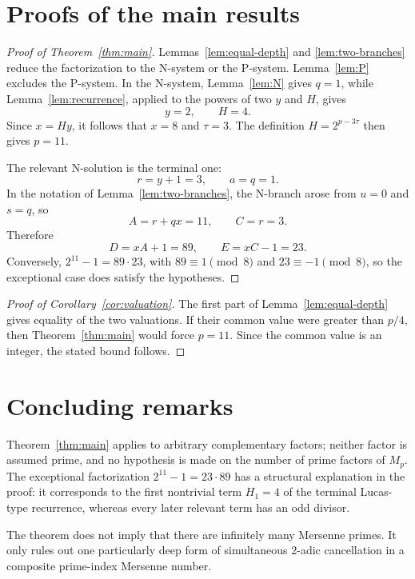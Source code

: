 \documentclass[11pt]{amsart}
\theoremstyle{remark}
\begin{document}
\section{Proofs of the main results}

\begin{proof}[Proof of Theorem~\ref{thm:main}]
Lemmas~\ref{lem:equal-depth} and \ref{lem:two-branches} reduce the
factorization to the N-system or the P-system.  Lemma~\ref{lem:P}
excludes the P-system.  In the N-system, Lemma~\ref{lem:N} gives
$q=1$, while Lemma~\ref{lem:recurrence}, applied to the powers of two
$y$ and $H$, gives
\[
 y=2,
 \qquad H=4.
\]
Since $x=Hy$, it follows that $x=8$ and $\tau=3$.  The definition
$H=2^{p-3\tau}$ then gives $p=11$.

The relevant N-solution is the terminal one:
\[
 r=y+1=3,
 \qquad a=q=1.
\]
In the notation of Lemma~\ref{lem:two-branches}, the N-branch arose
from $u=0$ and $s=q$, so
\[
 A=r+qx=11,
 \qquad C=r=3.
\]
Therefore
\[
 D=xA+1=89,
 \qquad E=xC-1=23.
\]
Conversely, $2^{11}-1=89\cdot23$, with
$89\equiv1\pmod8$ and $23\equiv-1\pmod8$, so the exceptional case
does satisfy the hypotheses.
\end{proof}

\begin{proof}[Proof of Corollary~\ref{cor:valuation}]
The first part of Lemma~\ref{lem:equal-depth} gives equality of the two
valuations.  If their common value were greater than $p/4$, then
Theorem~\ref{thm:main} would force $p=11$.  Since the common value is
an integer, the stated bound follows.
\end{proof}

\section{Concluding remarks}

Theorem~\ref{thm:main} applies to arbitrary complementary factors;
neither factor is assumed prime, and no hypothesis is made on the
number of prime factors of $M_p$.  The exceptional factorization
$2^{11}-1=23\cdot89$ has a structural explanation in the proof: it
corresponds to the first nontrivial term $H_1=4$ of the terminal
Lucas-type recurrence, whereas every later relevant term has an odd
divisor.

The theorem does not imply that there are infinitely many Mersenne
primes.  It only rules out one particularly deep form of simultaneous
$2$-adic cancellation in a composite prime-index Mersenne number.
\end{document}
